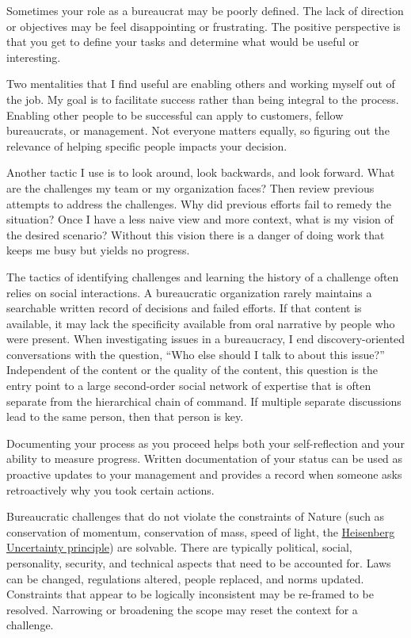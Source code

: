Sometimes your role as a bureaucrat may be poorly defined. The lack of direction or objectives may be feel disappointing or frustrating. The positive perspective is that you get to define your tasks and determine what would be useful or interesting. 

Two mentalities that I find useful are enabling others and working myself out of the job. My goal is to facilitate success rather than being integral to the process. Enabling other people to be successful can apply to customers, fellow bureaucrats, or management. Not everyone matters equally, so figuring out the relevance of helping specific people impacts your decision. 

Another tactic I use is to look around, look backwards, and look forward. What are the challenges my team or my organization faces? Then review previous attempts to address the challenges. Why did previous efforts fail to remedy the situation? Once I have a less naive view and more context, what is my vision of the desired scenario? Without this vision there is a danger of doing work that keeps me busy but yields no progress. 

The tactics of identifying challenges and learning the history of a challenge often relies on social interactions. A bureaucratic organization rarely maintains a searchable written record of decisions and failed efforts. If that content is available, it may lack the specificity available from oral narrative by people who were present. When investigating issues in a bureaucracy, I end discovery-oriented conversations with the question, ``Who else should I talk to about this issue?'' Independent of the content or the quality of the content, this question is the entry point to a large second-order social network of expertise that is often separate from the hierarchical chain of command. If multiple separate discussions lead to the same person, then that person is key. 

Documenting your process as you proceed helps both your self-reflection and your ability to measure progress. Written documentation of your status can be used as proactive updates to your management and provides a record when someone asks retroactively why you took certain actions.

Bureaucratic challenges that do not violate the constraints of Nature (such as conservation of momentum, conservation of mass, speed of light, the \href{https://en.wikipedia.org/wiki/Uncertainty_principle}{Heisenberg Uncertainty principle}) are solvable. There are typically political, social, personality, security, and technical aspects that need to be accounted for. Laws can be changed, regulations altered, people replaced, and norms updated. Constraints that appear to be logically inconsistent may be re-framed to be resolved. Narrowing or broadening the scope may reset the context for a challenge.




